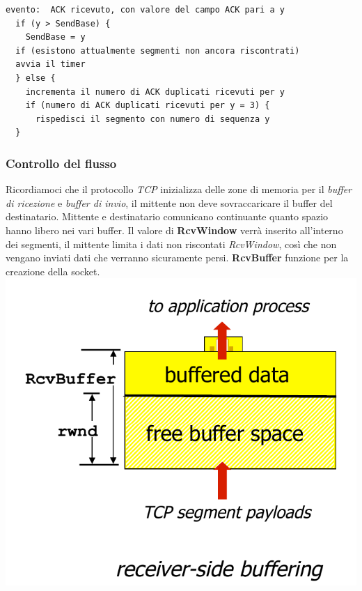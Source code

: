 \begin{lstlisting}
evento:  ACK ricevuto, con valore del campo ACK pari a y
  if (y > SendBase) {
    SendBase = y
  if (esistono attualmente segmenti non ancora riscontrati)
  avvia il timer
  } else {
    incrementa il numero di ACK duplicati ricevuti per y
    if (numero di ACK duplicati ricevuti per y = 3) {
      rispedisci il segmento con numero di sequenza y
  }
\end{lstlisting}

\subsubsection{Controllo del flusso}
Ricordiamoci che il protocollo \textit{TCP} inizializza delle zone di memoria per il \textit{buffer di ricezione} e \textit{buffer di invio}, il mittente non deve sovraccaricare il buffer del destinatario. 
Mittente e destinatario comunicano continuante quanto spazio hanno libero nei vari buffer.
Il valore di \textbf{RcvWindow} verrà inserito all'interno dei segmenti, il mittente limita i dati non riscontati \textit{RcvWindow}, così che non vengano inviati dati che verranno sicuramente persi. 
\textbf{RcvBuffer} funzione per la creazione della socket. \\ 
\includegraphics[width=\textwidth]{./img/tcpflowcontrol.png}  

